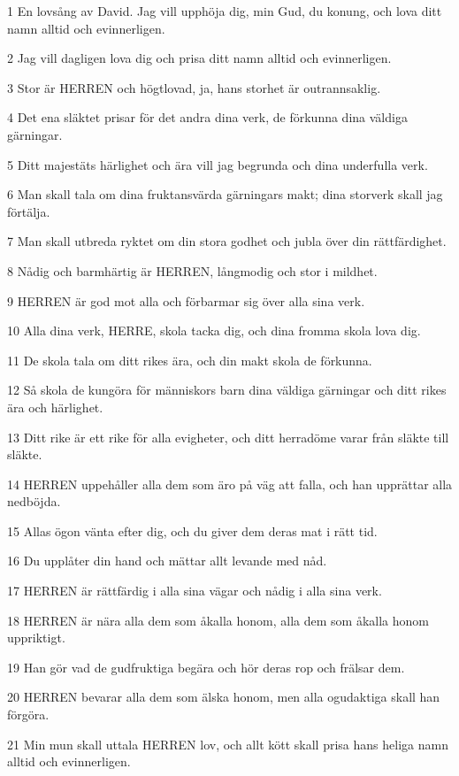 \par 1 En lovsång av David. Jag vill upphöja dig, min Gud, du konung, och lova ditt namn alltid och evinnerligen.
\par 2 Jag vill dagligen lova dig och prisa ditt namn alltid och evinnerligen.
\par 3 Stor är HERREN och högtlovad, ja, hans storhet är outrannsaklig.
\par 4 Det ena släktet prisar för det andra dina verk, de förkunna dina väldiga gärningar.
\par 5 Ditt majestäts härlighet och ära vill jag begrunda och dina underfulla verk.
\par 6 Man skall tala om dina fruktansvärda gärningars makt; dina storverk skall jag förtälja.
\par 7 Man skall utbreda ryktet om din stora godhet och jubla över din rättfärdighet.
\par 8 Nådig och barmhärtig är HERREN, långmodig och stor i mildhet.
\par 9 HERREN är god mot alla och förbarmar sig över alla sina verk.
\par 10 Alla dina verk, HERRE, skola tacka dig, och dina fromma skola lova dig.
\par 11 De skola tala om ditt rikes ära, och din makt skola de förkunna.
\par 12 Så skola de kungöra för människors barn dina väldiga gärningar och ditt rikes ära och härlighet.
\par 13 Ditt rike är ett rike för alla evigheter, och ditt herradöme varar från släkte till släkte.
\par 14 HERREN uppehåller alla dem som äro på väg att falla, och han upprättar alla nedböjda.
\par 15 Allas ögon vänta efter dig, och du giver dem deras mat i rätt tid.
\par 16 Du upplåter din hand och mättar allt levande med nåd.
\par 17 HERREN är rättfärdig i alla sina vägar och nådig i alla sina verk.
\par 18 HERREN är nära alla dem som åkalla honom, alla dem som åkalla honom uppriktigt.
\par 19 Han gör vad de gudfruktiga begära och hör deras rop och frälsar dem.
\par 20 HERREN bevarar alla dem som älska honom, men alla ogudaktiga skall han förgöra.
\par 21 Min mun skall uttala HERREN lov, och allt kött skall prisa hans heliga namn alltid och evinnerligen.

